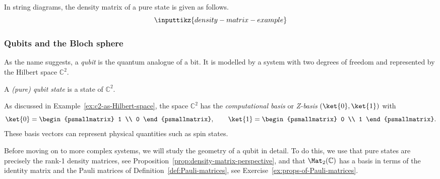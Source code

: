 \documentclass[a4paper,oneside, 12pt]{amsart}
\begin{document}
In string diagrams, the density matrix of a pure state is given as follows.
\begin{equation*}
  \inputtikz{density-matrix-example}
\end{equation*}


\subsubsection*{Qubits and the Bloch sphere}\label{sec:qubits-and-the-bloch-sphere}

As the name suggests, a \emph{qubit} is the quantum analogue of a bit.
It is modelled by a system with two degrees of freedom and represented by the Hilbert space \( \mathbb{C}^2 \).

\begin{definition}\label{def:qubit}
  A \emph{(pure) qubit state} is a state of \( \mathbb{C}^2 \).
\end{definition}

As discussed in Example~\ref{ex:c2-as-Hilbert-space}, the space \( \mathbb{C}^2 \) has the \emph{computational basis} or \emph{Z-basis}  \((\ket{0}, \ket{1})\) with
\begin{equation*}
  \ket{0} = \begin{psmallmatrix} 1 \\ 0 \end{psmallmatrix}, \qquad
  \ket{1} = \begin{psmallmatrix} 0 \\ 1 \end{psmallmatrix}.
\end{equation*}
These basis vectors can represent physical quantities such as spin states.
\bigskip

Before moving on to more complex systems, we will study the geometry of a qubit in detail.
To do this, we use that pure states are precisely the rank-1 density matrices, see Proposition~\ref{prop:density-matrix-perspective}, and that \( \Mat_2(\mathbb{C}) \) has a basis in terms of the identity matrix and the Pauli matrices of Definition~\ref{def:Pauli-matrices}, see Exercise~\ref{ex:props-of-Pauli-matrices}.
\end{document}
